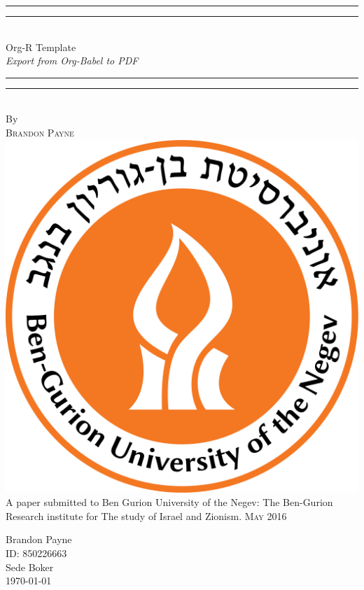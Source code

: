 %
\author{Brandon Payne}
%
\vspace*{13mm}
\begin{center}
\rule[0.5ex]{\linewidth}{2pt}\vspace*{-\baselineskip}\vspace*{3.2pt}
\rule[0.5ex]{\linewidth}{1pt}\\[\baselineskip]
{\Huge Org-R Template}\\[4mm]
{\Large \textit{Export from Org-Babel to PDF}}\\
\rule[0.5ex]{\linewidth}{1pt}\vspace*{-\baselineskip}\vspace{3.2pt}
\rule[0.5ex]{\linewidth}{2pt}\\
\vspace{6.5mm}
{\large By}\\
\vspace{6.5mm}
{\large\textsc{Brandon Payne}}\\
\vspace{11mm}
\includegraphics[scale=0.2]{bgu_logo}\\
\vspace{11mm}
A paper submitted to Ben Gurion University of the Negev: The Ben-Gurion Research institute for The study of Israel and Zionism.
\vspace{9mm}
{\large\textsc{May 2016}}
\vspace{12mm}
\end{center}
\begin{flushright}
{\Large Brandon Payne}\\
ID: 850226663\\
Sede Boker\\
{\large \today}
\end{flushright}
